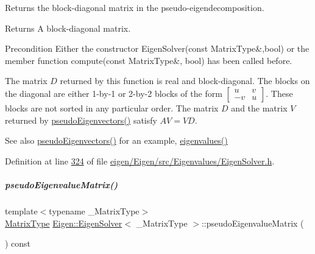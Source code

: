 Returns the block-\/diagonal matrix in the pseudo-\/eigendecomposition. 

\begin{DoxyReturn}{Returns}
A block-\/diagonal matrix.
\end{DoxyReturn}
\begin{DoxyPrecond}{Precondition}
Either the constructor Eigen\+Solver(const Matrix\+Type\&,bool) or the member function compute(const Matrix\+Type\&, bool) has been called before.
\end{DoxyPrecond}
The matrix $ D $ returned by this function is real and block-\/diagonal. The blocks on the diagonal are either 1-\/by-\/1 or 2-\/by-\/2 blocks of the form $ \begin{bmatrix} u & v \\ -v & u \end{bmatrix} $. These blocks are not sorted in any particular order. The matrix $ D $ and the matrix $ V $ returned by \hyperlink{group___eigenvalues___module_a4e796226f06e1f7347cf03a38755a155}{pseudo\+Eigenvectors()} satisfy $ AV = VD $.

\begin{DoxySeeAlso}{See also}
\hyperlink{group___eigenvalues___module_a4e796226f06e1f7347cf03a38755a155}{pseudo\+Eigenvectors()} for an example, \hyperlink{group___eigenvalues___module_a114189009e42f5e03372a7a3dfa33b97}{eigenvalues()} 
\end{DoxySeeAlso}


Definition at line \hyperlink{eigen_2_eigen_2src_2_eigenvalues_2_eigen_solver_8h_source_l00324}{324} of file \hyperlink{eigen_2_eigen_2src_2_eigenvalues_2_eigen_solver_8h_source}{eigen/\+Eigen/src/\+Eigenvalues/\+Eigen\+Solver.\+h}.

\mbox{\label{group___eigenvalues___module_a398ddf36ed919cdbfce7318b379790ca}} 
\subparagraph{\texorpdfstring{pseudo\+Eigenvalue\+Matrix()}{pseudoEigenvalueMatrix()}\hspace{0.1cm}{\footnotesize\ttfamily [2/2]}}
{\footnotesize\ttfamily template$<$typename \+\_\+\+Matrix\+Type$>$ \\
\hyperlink{group___eigenvalues___module_a83acd180404ddaac8a678fa65a6b632b}{Matrix\+Type} \hyperlink{group___eigenvalues___module_class_eigen_1_1_eigen_solver}{Eigen\+::\+Eigen\+Solver}$<$ \+\_\+\+Matrix\+Type $>$\+::pseudo\+Eigenvalue\+Matrix (\begin{DoxyParamCaption}{ }\end{DoxyParamCaption}) const}



